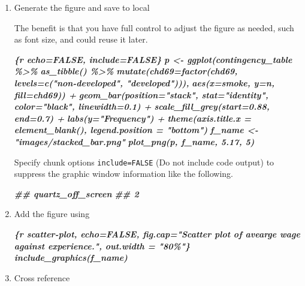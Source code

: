 \documentclass[
  a4paper,
  twoside,
  openright]{book}
\newenvironment{Shaded}{\begin{snugshade}}{\end{snugshade}}
\newcommand{\DocumentationTok}[1]{\textcolor[rgb]{0.56,0.35,0.01}{\textbf{\textit{#1}}}}
\newcommand{\InformationTok}[1]{\textcolor[rgb]{0.56,0.35,0.01}{\textbf{\textit{#1}}}}
\theoremstyle{definition}
\theoremstyle{definition}
\theoremstyle{definition}
\theoremstyle{definition}
\theoremstyle{remark}
\begin{document}
\begin{enumerate}
\def\labelenumi{\arabic{enumi}.}
\item
  Generate the figure and save to local

  The benefit is that you have full control to adjust the figure as needed, such as font size, and could reuse it later.

\begin{Shaded}
\begin{Highlighting}[]
\InformationTok{\textasciigrave{}\textasciigrave{}\textasciigrave{}\{r echo=FALSE, include=FALSE\}}
\InformationTok{p \textless{}{-} ggplot(contingency\_table \%\textgreater{}\% }
\InformationTok{           as\_tibble() \%\textgreater{}\% }
\InformationTok{           mutate(chd69=factor(chd69, levels=c("non{-}developed", "developed"))), }
\InformationTok{       aes(x=smoke, y=n, fill=chd69)) +}
\InformationTok{    geom\_bar(position="stack", stat="identity", color="black", linewidth=0.1) + }
\InformationTok{    scale\_fill\_grey(start=0.88, end=0.7) +}
\InformationTok{    labs(y="Frequency") +}
\InformationTok{    theme(axis.title.x = element\_blank(), legend.position = "bottom")}
\InformationTok{f\_name \textless{}{-} "images/stacked\_bar.png"}
\InformationTok{plot\_png(p, f\_name, 5.17, 5)}
\InformationTok{\textasciigrave{}\textasciigrave{}\textasciigrave{}}
\end{Highlighting}
\end{Shaded}

  Specify chunk options {\texttt{include=FALSE}} (Do not include code output) to suppress the graphic window information like the following.

\begin{Shaded}
\begin{Highlighting}[]
\DocumentationTok{\#\# quartz\_off\_screen }
\DocumentationTok{\#\#                 2}
\end{Highlighting}
\end{Shaded}
\item
  Add the figure using

\begin{Shaded}
\begin{Highlighting}[]
\InformationTok{\textasciigrave{}\textasciigrave{}\textasciigrave{}\{r scatter{-}plot, echo=FALSE, fig.cap="Scatter plot of avearge wage against experience.", out.width = "80\%"\}}
\InformationTok{include\_graphics(f\_name)}
\InformationTok{\textasciigrave{}\textasciigrave{}\textasciigrave{}}
\end{Highlighting}
\end{Shaded}
\item
  Cross reference


\end{enumerate}
\end{document}
